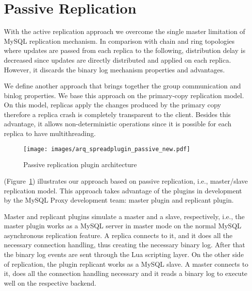 \section{Passive Replication}


With the active replication approach we overcome the single master limitation of MySQL replication mechanism. In comparison with chain and ring topologies where updates are passed from each replica to the following, distribution delay is decreased since updates are directly distributed and applied on each replica. However, it discards the binary log mechanism properties and advantages.




We define another approach that brings together the group communication and binlog properties. We base this approach on the primary-copy replication model. On this model, replicas apply the changes produced by the primary copy therefore a replica crash is completely transparent to the client. Besides this advantage, it allows non-deterministic operations since it is possible for each replica to have multithreading. 

\begin{figure}[t]
\centering    
\texttt{[image: images/arq\_spreadplugin\_passive\_new.pdf]}
\caption{Passive replication plugin architecture}
\label{fig:spread_plugin_passive}
\end{figure}

(Figure~\ref{fig:spread_plugin_passive}) illustrates our approach based on passive replication, i.e., master/slave replication model. This approach takes advantage of the plugins in development by the MySQL Proxy development team: master plugin and replicant plugin.

Master and replicant plugins simulate a master and a slave, respectively, i.e., the master plugin works as a MySQL server in master mode on the normal MySQL asynchronous replication feature. A replica connects to it, and it does all the necessary connection handling, thus creating the necessary binary log. After that the binary log events are sent through the Lua scripting layer.  
On the other side of replication, the plugin replicant works as a MySQL slave. A master connects to it, does all the connection handling necessary and it reads a binary log to execute well on the respective backend. 
 
